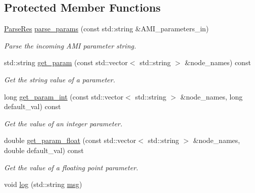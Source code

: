 \subsection*{Protected Member Functions}
\begin{DoxyCompactItemize}
\item 
\hyperlink{amimodel_8h_a5fbe8bcd249e7070ded2dadafa23ec1f}{Parse\+Res} \hyperlink{class_a_m_i_model_ad99c8cb946fe1d0b2197253130969368}{parse\+\_\+params} (const std\+::string \&A\+M\+I\+\_\+parameters\+\_\+in)
\begin{DoxyCompactList}\small\item\em Parse the incoming A\+M\+I parameter string. \end{DoxyCompactList}\item 
std\+::string \hyperlink{class_a_m_i_model_a62437e97ce61c76f4b9af78144385416}{get\+\_\+param} (const std\+::vector$<$ std\+::string $>$ \&node\+\_\+names) const 
\begin{DoxyCompactList}\small\item\em Get the string value of a parameter. \end{DoxyCompactList}\item 
long \hyperlink{class_a_m_i_model_a55b68d8a68be34f672d53968484225e1}{get\+\_\+param\+\_\+int} (const std\+::vector$<$ std\+::string $>$ \&node\+\_\+names, long default\+\_\+val) const 
\begin{DoxyCompactList}\small\item\em Get the value of an integer parameter. \end{DoxyCompactList}\item 
double \hyperlink{class_a_m_i_model_a2c2413b8658ec23c211cb993dc680fae}{get\+\_\+param\+\_\+float} (const std\+::vector$<$ std\+::string $>$ \&node\+\_\+names, double default\+\_\+val) const 
\begin{DoxyCompactList}\small\item\em Get the value of a floating point parameter. \end{DoxyCompactList}\item 
void \hyperlink{class_a_m_i_model_a1e8cbd58a09b712dcf76a12f439bce30}{log} (std\+::string \hyperlink{class_a_m_i_model_ae65d47400fd3736682c229dab31392ad}{msg})
\end{DoxyCompactItemize}

